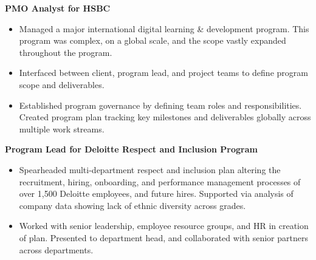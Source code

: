 \documentclass[11pt,letter]{moderncv}
\begin{document}
\textbf{PMO Analyst for HSBC}
\begin{itemize}[label=\large\color{color1}{$\bullet$}]
  \item Managed a major international digital learning \& development program.
    This program was complex, on a global scale, and the scope vastly expanded
    throughout the program.
  \item Interfaced between client, program lead, and project teams to
    define program scope and deliverables.
  \item Established program governance by defining team roles and
    responsibilities. Created program plan tracking key milestones and
    deliverables globally across multiple work streams.
\end{itemize}
\textbf{Program Lead for Deloitte Respect and Inclusion Program}
%
\begin{itemize}[label=\large\color{color1}{$\bullet$}]
  \item Spearheaded multi-department respect and inclusion plan altering the
    recruitment, hiring, onboarding, and performance management processes of
    over 1,500 Deloitte employees, and future hires. Supported via analysis of
    company data showing lack of ethnic diversity across grades.
  \item Worked with senior leadership, employee resource groups,
    and HR in creation of plan. Presented to department head, and collaborated with senior
    partners across departments.
\end{itemize}
\end{document}
